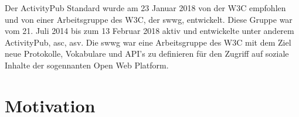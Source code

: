 {		
	Der ActivityPub\cite{activityPub} Standard wurde am 23 Januar 2018 von der W3C empfohlen und von einer Arbeitsgruppe des W3C, der \gls{swwg}\cite{socialWg,pushSocialWeb}, entwickelt. Diese Gruppe war vom 21. Juli 2014 bis zum 13 Februar 2018 aktiv\cite{socialWg} und entwickelte unter anderem ActivityPub, \gls{asc}\cite{activityStreamsCore}, \gls{asv}\cite{activityStreamsVocabulary}. Die \gls{swwg} war eine Arbeitsgruppe des W3C mit dem Ziel neue Protokolle, Vokabulare und API's zu definieren für den Zugriff auf soziale Inhalte der sogennanten Open Web Platform\cite{social-wg-charter}.\\
}

\section{Motivation}
\label{sec:Introduction:Motivation}
